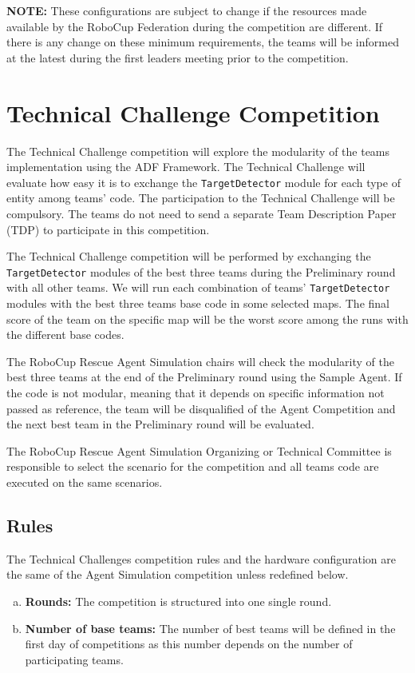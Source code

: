 \documentclass{article}
\begin{document}
\textbf{NOTE:} These configurations are subject to change if the resources made available by the RoboCup Federation during the competition are different. If there is any change on these minimum requirements, the teams will be informed at the latest during the first leaders meeting prior to the competition.
\section{Technical Challenge Competition}
\label{sec:technical}
The Technical Challenge competition will explore the modularity of the teams implementation using the ADF Framework. The Technical Challenge will evaluate how easy it is to exchange the \texttt{TargetDetector} module for each type of entity among teams' code. The participation to the Technical Challenge will be compulsory. The teams do not need to send a separate Team Description Paper (TDP) to participate in this competition.

The Technical Challenge competition will be performed by exchanging the \texttt{TargetDetector} modules of the best three teams during the Preliminary round with all other teams. We will run each combination of teams' \texttt{TargetDetector} modules with the best three teams base code in some selected maps. The final score of the team on the specific map will be the worst score among the runs with the different base codes.

The RoboCup Rescue Agent Simulation chairs will check the modularity of the best three teams at the end of the Preliminary round using the Sample Agent. If the code is not modular, meaning that it depends on specific information not passed as reference, the team will be disqualified of the Agent Competition and the next best team in the Preliminary round will be evaluated.

The RoboCup Rescue Agent Simulation Organizing or Technical Committee is responsible to select the scenario for the competition and all teams code are executed on the same scenarios.
\subsection{Rules}
The Technical Challenges competition rules and the hardware configuration are the same of the Agent Simulation competition unless redefined below.
\begin{enumerate}[(a)]
\item \textbf{Rounds:} The competition is structured into one single round.
\item \textbf{Number of base teams:} The number of best teams will be defined in the first day of competitions as this number depends on the number of participating teams.
\end{enumerate}
\end{document}
